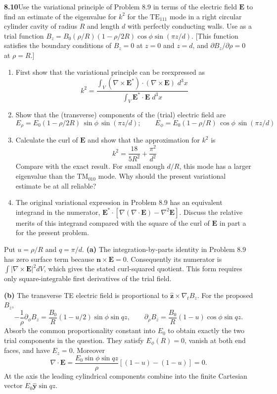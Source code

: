 \par\bigskip
\noindent\textbf{8.10}\quad Use the variational principle of Problem 8.9 in terms of the electric field $\mathbf{E}$ to find an estimate of the eigenvalue for $k^{2}$ for the $\mathrm{TE}_{111}$ mode in a right circular cylinder cavity of radius $R$ and length $d$ with perfectly conducting walls. Use as a trial function $B_{z}=B_{0}(\rho/R)(1-\rho/2R)\cos\phi\sin(\pi z/d)$. [This function satisfies the boundary conditions of $B_{z}=0$ at $z=0$ and $z=d$, and $\partial B_{z}/\partial\rho=0$ at $\rho=R$.]
\begin{enumerate}
\item[(a)] First show that the variational principle can be reexpressed as
\[
k^{2}=\frac{\displaystyle\int_{V}(\nabla\times\mathbf{E}^{*})\cdot(\nabla\times\mathbf{E})\;d^{3}x}{\displaystyle\int_{V}\mathbf{E}^{*}\cdot\mathbf{E}\;d^{3}x}
\]
\item[(b)] Show that the (transverse) components of the (trial) electric field are
\[
E_{\rho}=E_{0}(1-\rho/2R)\,\sin\phi\,\sin(\pi z/d);\qquad
E_{\phi}=E_{0}(1-\rho/R)\,\cos\phi\,\sin(\pi z/d)
\]
\item[(c)] Calculate the curl of $\mathbf{E}$ and show that the approximation for $k^{2}$ is
\[
k^{2}=\frac{18}{5R^{2}}+\frac{\pi^{2}}{d^{2}}
\]
Compare with the exact result. For small enough $d/R$, this mode has a larger eigenvalue than the $\mathrm{TM}_{010}$ mode. Why should the present variational estimate be at all reliable?
\item[(d)] The original variational expression in Problem 8.9 has an equivalent integrand in the numerator, $\mathbf{E}^{*}\cdot[\nabla(\nabla\cdot\mathbf{E})-\nabla^{2}\mathbf{E}]$. Discuss the relative merits of this integrand compared with the square of the curl of $\mathbf{E}$ in part a for the present problem.
\end{enumerate}
\solution

Put $u=\rho/R$ and $q=\pi/d$.
\textbf{(a)} The integration-by-parts identity in Problem 8.9 has
zero surface term because $\mathbf n\times\mathbf E=0$.
Consequently its numerator is $\int|\nabla\times\mathbf E|^2dV$,
which gives the stated curl-squared quotient.  This form requires
only square-integrable first derivatives of the trial field.

\textbf{(b)} The transverse TE electric field is proportional to
$\hat{\mathbf z}\times\nabla_tB_z$.  For the proposed $B_z$,
\[
-\frac1\rho\partial_\phi B_z
=\frac{B_0}{R}(1-u/2)\sin\phi\sin qz,\qquad
\partial_\rho B_z=\frac{B_0}{R}(1-u)\cos\phi\sin qz.
\]
Absorb the common proportionality constant into $E_0$ to obtain
exactly the two trial components in the question.  They satisfy
$E_\phi(R)=0$, vanish at both end faces, and have $E_z=0$.
Moreover
\[
\nabla\cdot\mathbf E=
\frac{E_0\sin\phi\sin qz}{\rho}
[(1-u)-(1-u)]=0.
\]
At the axis the leading cylindrical components combine into the
finite Cartesian vector $E_0\hat{\mathbf y}\sin qz$.

